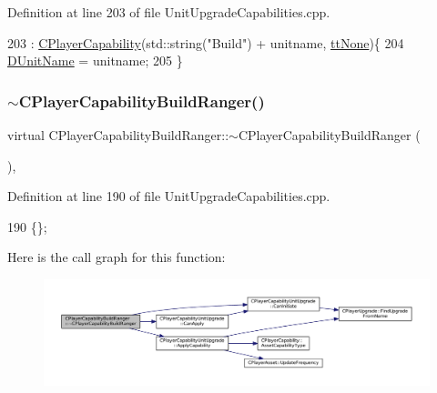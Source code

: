 Definition at line 203 of file Unit\+Upgrade\+Capabilities.\+cpp.


\begin{DoxyCode}
203                                                                                     : 
      \hyperlink{classCPlayerCapability_a303de62aba5d3f65d9a8e013c64a96c1}{CPlayerCapability}(std::string(\textcolor{stringliteral}{"Build"}) + unitname, \hyperlink{classCPlayerCapability_a9d3450ed1532fd536bd6cbb1e2eef02fac78f0e806a6b0ead030d63c27c9ce929}{ttNone})\{
204     \hyperlink{classCPlayerCapabilityBuildRanger_a4e85674699365fe1e77bcb2a1996d7ba}{DUnitName} = unitname;
205 \}
\end{DoxyCode}
\hypertarget{classCPlayerCapabilityBuildRanger_a624146c70790e8a3d85db28a42a466d2}{}\label{classCPlayerCapabilityBuildRanger_a624146c70790e8a3d85db28a42a466d2} 
\subsubsection{\texorpdfstring{$\sim$\+C\+Player\+Capability\+Build\+Ranger()}{~CPlayerCapabilityBuildRanger()}}
{\footnotesize\ttfamily virtual C\+Player\+Capability\+Build\+Ranger\+::$\sim$\+C\+Player\+Capability\+Build\+Ranger (\begin{DoxyParamCaption}{ }\end{DoxyParamCaption})\hspace{0.3cm}{\ttfamily [inline]}, {\ttfamily [virtual]}}



Definition at line 190 of file Unit\+Upgrade\+Capabilities.\+cpp.


\begin{DoxyCode}
190 \{\};
\end{DoxyCode}
Here is the call graph for this function\+:
\nopagebreak
\begin{figure}[H]
\begin{center}
\leavevmode
\includegraphics[width=350pt]{classCPlayerCapabilityBuildRanger_a624146c70790e8a3d85db28a42a466d2_cgraph}
\end{center}
\end{figure}


